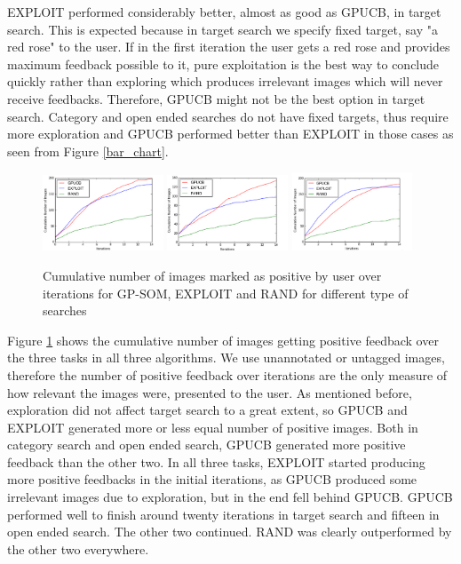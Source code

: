 \documentclass[english]{tktltiki}
\begin{document}
EXPLOIT performed considerably better, almost as good as GPUCB, in target search. This is expected because in target search we specify fixed target, say "a red rose" to the user. If in the first iteration the user gets a red rose and provides maximum feedback possible to it, pure exploitation is the best way to conclude quickly rather than exploring which produces irrelevant images which will never receive feedbacks. Therefore, GPUCB might not be the best option in target search. Category and open ended searches do not have fixed targets, thus require more exploration and GPUCB performed better than EXPLOIT in those cases as seen from Figure \ref{bar_chart}.

\begin{figure}[h!]
  \centering
    \includegraphics[width=0.32\textwidth]{figures/Target_Positive.png}
    \includegraphics[width=0.32\textwidth]{figures/Category_Positive.png}
    \includegraphics[width=0.32\textwidth]{figures/Open_Positive.png}
    \caption{Cumulative number of images marked as positive by user over iterations for GP-SOM, EXPLOIT and RAND for different type of searches}
    \label{positive_feedback}
\end{figure}

Figure \ref{positive_feedback} shows the cumulative number of images getting positive feedback over the three tasks in all three algorithms. We use unannotated or untagged images, therefore the number of positive feedback over iterations are the only measure of how relevant the images were, presented to the user. As mentioned before, exploration did not affect target search to a great extent, so GPUCB and EXPLOIT generated more or less equal number of positive images. Both in category search and open ended search, GPUCB generated more positive feedback than the other two. In all three tasks, EXPLOIT started producing more positive feedbacks in the initial iterations, as GPUCB produced some irrelevant images due to exploration, but in the end fell behind GPUCB. GPUCB performed well to finish around twenty iterations in target search and fifteen in open ended search. The other two continued. RAND was clearly outperformed by the other two everywhere.
\end{document}
